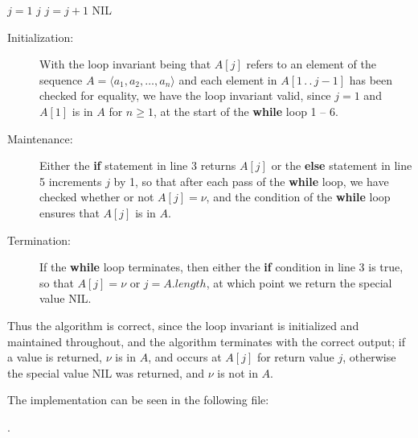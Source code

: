 
\begin{algorithmic}[1]
    \STATE $j = 1$
            \RETURN $j$
        \ELSE
            \STATE $j = j + 1$
        \ENDIF
    \ENDWHILE
    \RETURN \textrm{NIL}
\end{algorithmic}

\begin{description}
    \item[Initialization:] With the loop invariant being that $A[j]$ refers to an 
        element of the sequence $A = \langle a_1, a_2, \ldots, a_n \rangle$ and 
        each element in $A[1\, .\, .\, j - 1]$ has been checked for equality, we 
        have the loop invariant valid, since $j = 1$ and $A[1]$ is in $A$ for 
        $n \ge 1$, at the start of the \textbf{while} loop 1 -- 6.
    \item[Maintenance:] Either the \textbf{if} statement in line 3 returns $A[j]$
        or the \textbf{else} statement in line 5 increments $j$ by 1, so that after
        each pass of the \textbf{while} loop, we have checked whether or not 
        $A[j] = \nu$, and the condition of the \textbf{while} loop ensures that 
        $A[j]$ is in $A$.
    \item[Termination:] If the \textbf{while} loop terminates, then either the 
        \textbf{if} condition in line 3 is true, so that $A[j] = \nu$ or 
        $j = A.\mathit{length}$, at which point we return the special value
        \textrm{NIL}.
\end{description}

Thus the algorithm is correct, since the loop invariant is initialized and 
maintained throughout, and the algorithm terminates with the correct output;
if a value is returned, $\nu$ is in $A$, and occurs at $A[j]$ for return value
$j$, otherwise the special value \textrm{NIL} was returned, and $\nu$ is not in $A$.

The implementation can be seen in the following file:

.
